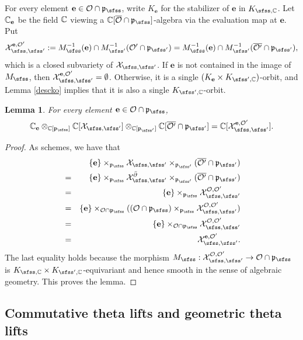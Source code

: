 \documentclass[12pt,a4paper]{amsart}
\newcommand{\CO}{{\mathcal {O}}}
\newcommand{\CX}{{\mathcal {X}}}
\newcommand{\p}{\mathfrak p}
\numberwithin{equation}{section}
\newtheorem{lem}[thm]{Lemma}
\theoremstyle{remark}
\begin{document}
For every element $\mathbf e\in \CO\cap \p_\sfss$, write $K_\mathbf e$ for the stabilizer of $\mathbf e$ in $K_{\sfss, \C}$. Let $\mathbb{C}_\mathbf e$ be the field $\mathbb{C}$ viewing a  $\C[\overline \CO\cap \p_\sfss]$-algebra via the evaluation map at $\mathbf e$. Put
\[
  \CX_{\sfss, \sfss'}^{\mathbf e, \CO'}:=M_\sfss^{-1}(\mathbf e)\cap M_{\sfss'}^{-1}(\CO'\cap\p_{\sfss'})=M_\sfss^{-1}(\mathbf e)\cap M_{\sfss'}^{-1}(\overline{\CO'}\cap\p_{\sfss'}),
\]
which is a closed subvariety of $\CX_{\sfss, \sfss'}$. If $\mathbf e$ is not contained in the image of $M_\sfss$, then $\CX_{\sfss, \sfss'}^{\mathbf e, \CO'}=\emptyset$. Otherwise, it is a single
$(K_\mathbf e\times K_{\sfss',\C})$-orbit, and Lemma \ref{descko} implies that it is also a single $K_{\sfss',\C}$-orbit.
\begin{lem}\label{fiber111}
For every element $\mathbf e\in \CO\cap \p_\sfss$, 
\[
  \C_\mathbf e \otimes_{\C[\p_{\sfss}]} \C[\CX_{\sfss, \sfss'}]\otimes_{\C[\p_{\sfss'}]} \C[\overline{\CO'}\cap \p_{\sfss'}]=\C[\CX_{\sfss, \sfss'}^{\mathbf e, \CO'}].
\]
\end{lem}
\begin{proof}
As schemes, we have that
\begin{eqnarray*}
  &&\{\mathbf e\}\times_{\p_\sfss}{\CX_{\sfss, \sfss'}}\times_{\p_{\sfss'}} (\overline{\CO'}\cap \p_{\sfss'})\\
  &=& \{\mathbf e\}\times_{\p_\sfss}{\CX^{\bar \partial}_{\sfss, \sfss'}}\times_{\p_{\sfss'}} (\overline{\CO'}\cap \p_{\sfss'})\\
    &=& \{\mathbf e\}\times_{\p_\sfss}   \CX_{\sfss, \sfss'}^{\CO, \CO'}\\
    &=& \{\mathbf e\} \times_{\CO\cap \p_\sfss} ( (\CO\cap \p_\sfss) \times_{\p_\sfss} \CX_{\sfss, \sfss'}^{\CO, \CO'})\\
     &=& \{\mathbf e\} \times_{\CO\cap \p_\sfss} \CX_{\sfss, \sfss'}^{\CO, \CO'}\\
   &=& \CX_{\sfss, \sfss'}^{\mathbf e, \CO'}.
\end{eqnarray*}
The last equality holds because the morphism
$M_\sfss: \CX_{\sfss, \sfss'}^{\CO, \CO'}\rightarrow \CO\cap \p_\sfss$  is
$K_{\sfss, \C}\times K_{\sfss',\C}$-equivariant and hence smooth in the sense of
algebraic geometry. This proves the lemma. %
\end{proof}


\subsection{Commutative theta lifts and  geometric theta lifts}
\end{document}
